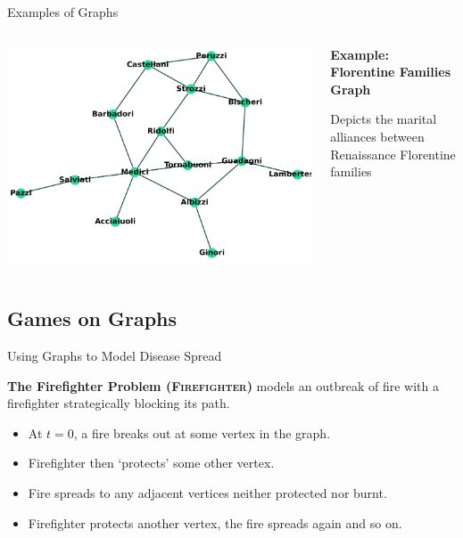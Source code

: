 \documentclass[unknownkeysallowed]{beamer}
\begin{document}
\begin{frame}{Examples of Graphs}

\begin{columns}

\begin{column}{.6\textwidth}
\includegraphics[width=.8\linewidth,valign=t]{assets/florentine}
\end{column}

\begin{column}{.4\textwidth}
\textbf{Example: Florentine Families Graph}
\vspace{5pt}

Depicts the marital alliances between Renaissance Florentine families %

\end{column}

\end{columns}

\end{frame}

\subsection{Games on Graphs}

\begin{frame}{Using Graphs to Model Disease Spread}

\textbf{The Firefighter Problem ({\scshape Firefighter})} %
models an outbreak of fire with a firefighter strategically blocking its path.

\begin{itemize}
	\pause
	\item At $t=0$, a fire breaks out at some vertex in the graph.
	\pause
	\item Firefighter then `protects' some other vertex.
	\pause
	\item Fire spreads to any adjacent vertices neither protected nor burnt. 
	\pause
	\item Firefighter protects another vertex, the fire spreads again and so on.
\end{itemize}

\end{frame}
\end{document}
